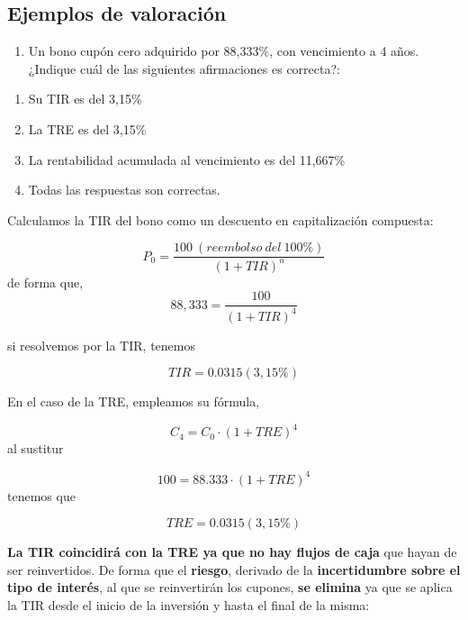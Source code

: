 \documentclass[
  letterpaper,
  DIV=11,
  numbers=noendperiod]{scrreprt}
\providecommand{\tightlist}{%
  \setlength{\itemsep}{0pt}\setlength{\parskip}{0pt}}\usepackage{longtable,booktabs,array}
\begin{document}
\begin{tcolorbox}
\begin{tcolorbox}[enhanced jigsaw, toprule=.15mm, left=2mm, arc=.35mm, breakable, bottomrule=.15mm, opacityback=0, rightrule=.15mm, leftrule=.75mm, colframe=quarto-callout-note-color-frame, colback=white]
\begin{minipage}[t]{\textwidth - 5.5mm}
\end{minipage}%
\end{tcolorbox}

\subsection{Ejemplos de valoración}\label{ejemplos-de-valoraciuxf3n}

\begin{enumerate}
\def\labelenumi{\arabic{enumi}.}
\tightlist
\item
  Un bono cupón cero adquirido por 88,333\%, con vencimiento a 4 años.
  ¿Indique cuál de las siguientes afirmaciones es correcta?:
\end{enumerate}

\begin{enumerate}
\def\labelenumi{\alph{enumi}.}
\item
  Su TIR es del 3,15\%
\item
  La TRE es del 3,15\%
\item
  La rentabilidad acumulada al vencimiento es del 11,667\%
\item
  Todas las respuestas son correctas.
\end{enumerate}

\begin{tcolorbox}[enhanced jigsaw, toprule=.15mm, left=2mm, arc=.35mm, breakable, bottomrule=.15mm, opacityback=0, rightrule=.15mm, leftrule=.75mm, colframe=quarto-callout-note-color-frame, colback=white]
\begin{minipage}[t]{5.5mm}
\textcolor{quarto-callout-note-color}{\faInfo}
\end{minipage}%
\begin{minipage}[t]{\textwidth - 5.5mm}

Calculamos la TIR del bono como un descuento en capitalización
compuesta:

\[P_0=\frac{100\ (reembolso \ del  \ 100\%)}{\left(1+TIR\right)^n}\] de
forma que, \[88,333=\frac{100}{\left(1+TIR\right)^4}\]

si resolvemos por la TIR, tenemos

\[TIR=0.0315(3,15\%)\]

En el caso de la TRE, empleamos su fórmula,

\[C_4=C _0\cdot (1+TRE)^4\] al sustitur

\[100=88.333\cdot (1+TRE)^4\] tenemos que

\[TRE=0.0315(3,15\%)\]

\textbf{La TIR coincidirá con la TRE ya que no hay flujos de caja} que
hayan de ser reinvertidos. De forma que el \textbf{riesgo}, derivado de
la \textbf{incertidumbre sobre el tipo de interés}, al que se
reinvertirán los cupones, \textbf{se elimina} ya que se aplica la TIR
desde el inicio de la inversión y hasta el final de la misma:


\end{minipage}
\end{tcolorbox}
\end{tcolorbox}
\end{document}
